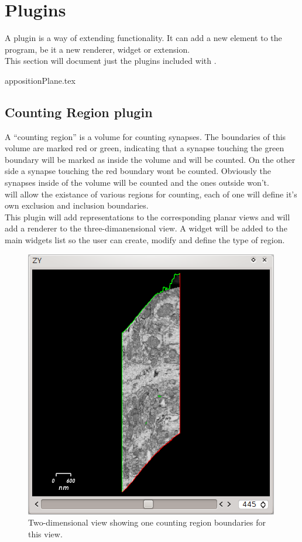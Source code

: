 \section{Plugins}

A plugin is a way of extending \espina{} functionality. It can
add a new element to the program, be it a new renderer, widget or
extension. \\
This section will document just the plugins included with \espina.

 {appositionPlane.tex}

\subsection{Counting Region plugin}

A ``counting region'' is a volume for counting synapses. The boundaries of this
volume are marked red or green, indicating that a synapse touching the green boundary
will be marked as inside the volume and will be counted. On the other side a synapse
touching the red boundary wont be counted. Obviously the synapses inside of the volume
will be counted and the ones outside won't.\\
\espina{} will allow the existance of various regions for counting, each of one will
define it's own exclusion and inclusion boundaries.\\
This plugin will add representations to the corresponding planar views and will add a 
renderer to the three-dimanensional view. A widget will be added to the main widgets list 
so the user can create, modify and define the type of region.\\

\begin{figure}[H]
\centering
\includegraphics[scale=0.5]{fig/plugin-ct-2Dwidget.png}
\caption{Two-dimensional view showing one counting region boundaries for this view.}
\end{figure}

